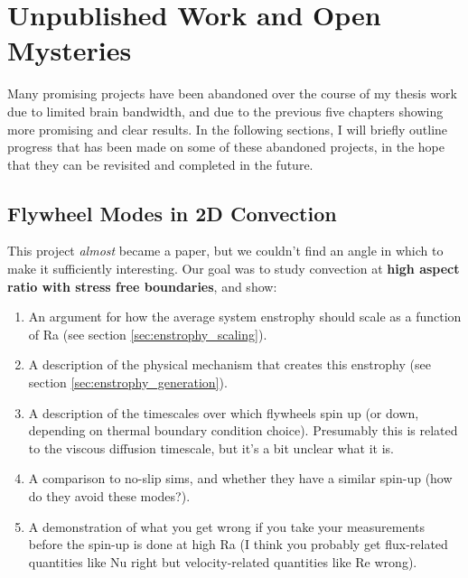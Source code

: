 \chapter{Unpublished Work and Open Mysteries}
\label{ch:unpublished}

Many promising projects have been abandoned over the course of my thesis work due to limited brain bandwidth, and due to the previous five chapters showing more promising and clear results.
In the following sections, I will briefly outline progress that has been made on some of these abandoned projects, in the hope that they can be revisited and completed in the future.

\section{Flywheel Modes in 2D Convection}
\label{sec:flywheels}
This project \emph{almost} became a paper, but we couldn't find an angle in which to make it sufficiently interesting.
Our goal was to study \RB convection at \textbf{high aspect ratio with stress free boundaries}, and show:
\begin{enumerate}
\item An argument for how the average system enstrophy should scale as a function of Ra (see section \ref{sec:enstrophy_scaling}).
\item A description of the physical mechanism that creates this enstrophy (see section \ref{sec:enstrophy_generation}).
\item A description of the timescales over which flywheels spin up (or down, depending on thermal boundary condition choice).
Presumably this is related to the viscous diffusion timescale, but it's a bit unclear what it is.
\item A comparison to no-slip sims, and whether they have a similar spin-up (how do they avoid these modes?).
\item A demonstration of what you get wrong if you take your measurements before the spin-up is done at high Ra (I think you probably get flux-related quantities like Nu right but velocity-related quantities like Re wrong).
\end{enumerate}

